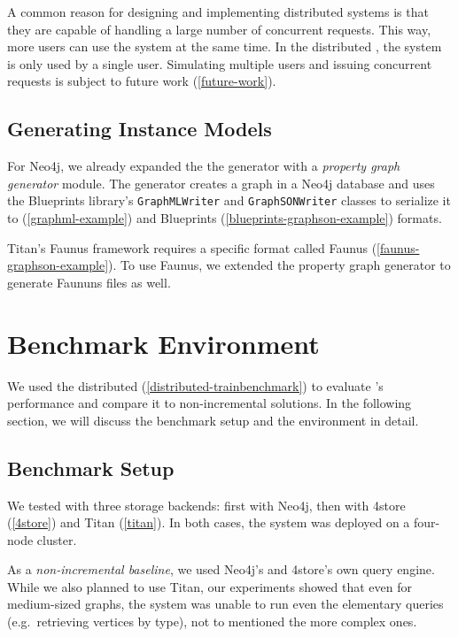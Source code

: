 A common reason for designing and implementing distributed systems is that they are capable of handling a large number of concurrent requests. This way, more users can use the system at the same time. In the distributed \tb{}, the system is only used by a single user. Simulating multiple users and issuing concurrent requests is subject to future work (\autoref{future-work}).

\subsection{Generating Instance Models}

For Neo4j, we already expanded the the generator with a \emph{property graph generator} module. The generator creates a graph in a Neo4j database and uses the Blueprints library's \texttt{GraphMLWriter} and \texttt{GraphSONWriter} classes to serialize it to \graphml{} (\autoref{graphml-example}) and Blueprints \graphson{} (\autoref{blueprints-graphson-example}) formats. 

Titan's Faunus framework requires a specific format called Faunus \graphson{} (\autoref{faunus-graphson-example}). To use Faunus, we extended the property graph generator to generate Faununs \graphson{} files as well.


\section{Benchmark Environment}
\label{sec:benchmark-environment}

We used the distributed \tb{} (\autoref{distributed-trainbenchmark}) to evaluate \iqd{}'s performance and compare it to non-incremental solutions. In the following section, we will discuss the benchmark setup and the environment in detail. 

\subsection{Benchmark Setup}

We tested \iqd{} with three storage backends: first with Neo4j, then with 4store (\autoref{4store}) and Titan (\autoref{titan}). In both cases, the system was deployed on a four-node cluster.

As a \emph{non-incremental baseline}, we used Neo4j's and 4store's own query engine. While we also planned to use Titan, our experiments showed that even for medium-sized graphs, the system was unable to run even the elementary queries (e.g.\ retrieving vertices by type), not to mentioned the more complex ones.

